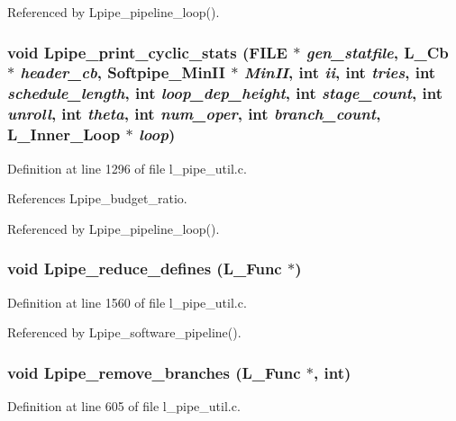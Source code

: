 Referenced by Lpipe\_\-pipeline\_\-loop().
\subsubsection{\setlength{\rightskip}{0pt plus 5cm}void Lpipe\_\-print\_\-cyclic\_\-stats (FILE $\ast$ {\em gen\_\-statfile}, L\_\-Cb $\ast$ {\em header\_\-cb}, Softpipe\_\-Min\-II $\ast$ {\em Min\-II}, int {\em ii}, int {\em tries}, int {\em schedule\_\-length}, int {\em loop\_\-dep\_\-height}, int {\em stage\_\-count}, int {\em unroll}, int {\em theta}, int {\em num\_\-oper}, int {\em branch\_\-count}, L\_\-Inner\_\-Loop $\ast$ {\em loop})}\label{l__pipe__util_8h_1717d05a7fa2b065c482d5476745d580}




Definition at line 1296 of file l\_\-pipe\_\-util.c.

References Lpipe\_\-budget\_\-ratio.

Referenced by Lpipe\_\-pipeline\_\-loop().
\subsubsection{\setlength{\rightskip}{0pt plus 5cm}void Lpipe\_\-reduce\_\-defines (L\_\-Func $\ast$)}\label{l__pipe__util_8h_a449ba296611b2121b42074e012392ae}




Definition at line 1560 of file l\_\-pipe\_\-util.c.

Referenced by Lpipe\_\-software\_\-pipeline().
\subsubsection{\setlength{\rightskip}{0pt plus 5cm}void Lpipe\_\-remove\_\-branches (L\_\-Func $\ast$, int)}\label{l__pipe__util_8h_b00f5d107ce583fe74323bce6d807120}




Definition at line 605 of file l\_\-pipe\_\-util.c.

